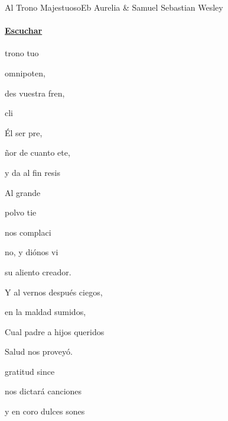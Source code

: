 \documentclass[12pt, spanish]{book}
\newcommand{\NotCCLIed}{\relax}
\begin{document}
    \begin{song}{Al Trono Majestuoso}{Eb}
    {} %
    {Aurelia \& Samuel Sebastian Wesley}
    {} %
    {} %
        \ifChordBk
        \paragraph{\mbox{}\hfill\protect\href{https://open.spotify.com/intl-es/track/3JMkcZTcVrtVau3B4zKDgn}{Escuchar}\mbox{}\hfill}
        \fi

        \begin{SBChorus}
             trono tuo

              omnipoten,

            des vuestra fren,

             cli

            Él   ser pre,

            ñor de cuanto ete,

            y da al fin resis

            Al grande 
        \end{SBChorus}

        \begin{SBOpGroup}
             polvo   tie

            nos complaci

             no, y diónos vi

            su aliento creador.

            Y al vernos después ciegos,

            en la maldad sumidos,

            Cual padre a hijos queridos

            Salud nos proveyó.
        \end{SBOpGroup}
        \vskip 20pt
        \begin{SBOpGroup}
             gratitud since

            nos dictará canciones

            y en coro dulces sones


\end{SBOpGroup}
\end{song}
\end{document}
